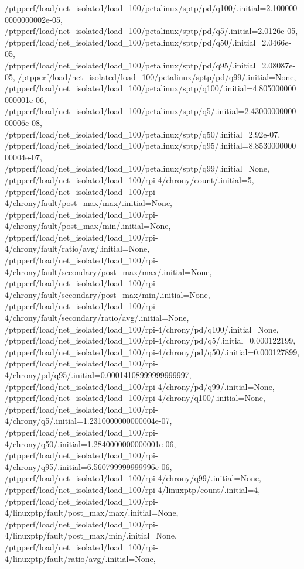 {    /ptpperf/load/net_isolated/load_100/petalinux/sptp/pd/q100/.initial=2.1000000000000002e-05,
    /ptpperf/load/net_isolated/load_100/petalinux/sptp/pd/q5/.initial=2.0126e-05,
    /ptpperf/load/net_isolated/load_100/petalinux/sptp/pd/q50/.initial=2.0466e-05,
    /ptpperf/load/net_isolated/load_100/petalinux/sptp/pd/q95/.initial=2.08087e-05,
    /ptpperf/load/net_isolated/load_100/petalinux/sptp/pd/q99/.initial=None,
    /ptpperf/load/net_isolated/load_100/petalinux/sptp/q100/.initial=4.805000000000001e-06,
    /ptpperf/load/net_isolated/load_100/petalinux/sptp/q5/.initial=2.4300000000000006e-08,
    /ptpperf/load/net_isolated/load_100/petalinux/sptp/q50/.initial=2.92e-07,
    /ptpperf/load/net_isolated/load_100/petalinux/sptp/q95/.initial=8.853000000000004e-07,
    /ptpperf/load/net_isolated/load_100/petalinux/sptp/q99/.initial=None,
    /ptpperf/load/net_isolated/load_100/rpi-4/chrony/count/.initial=5,
    /ptpperf/load/net_isolated/load_100/rpi-4/chrony/fault/post_max/max/.initial=None,
    /ptpperf/load/net_isolated/load_100/rpi-4/chrony/fault/post_max/min/.initial=None,
    /ptpperf/load/net_isolated/load_100/rpi-4/chrony/fault/ratio/avg/.initial=None,
    /ptpperf/load/net_isolated/load_100/rpi-4/chrony/fault/secondary/post_max/max/.initial=None,
    /ptpperf/load/net_isolated/load_100/rpi-4/chrony/fault/secondary/post_max/min/.initial=None,
    /ptpperf/load/net_isolated/load_100/rpi-4/chrony/fault/secondary/ratio/avg/.initial=None,
    /ptpperf/load/net_isolated/load_100/rpi-4/chrony/pd/q100/.initial=None,
    /ptpperf/load/net_isolated/load_100/rpi-4/chrony/pd/q5/.initial=0.000122199,
    /ptpperf/load/net_isolated/load_100/rpi-4/chrony/pd/q50/.initial=0.000127899,
    /ptpperf/load/net_isolated/load_100/rpi-4/chrony/pd/q95/.initial=0.00014108999999999997,
    /ptpperf/load/net_isolated/load_100/rpi-4/chrony/pd/q99/.initial=None,
    /ptpperf/load/net_isolated/load_100/rpi-4/chrony/q100/.initial=None,
    /ptpperf/load/net_isolated/load_100/rpi-4/chrony/q5/.initial=1.2310000000000004e-07,
    /ptpperf/load/net_isolated/load_100/rpi-4/chrony/q50/.initial=1.2840000000000001e-06,
    /ptpperf/load/net_isolated/load_100/rpi-4/chrony/q95/.initial=6.560799999999996e-06,
    /ptpperf/load/net_isolated/load_100/rpi-4/chrony/q99/.initial=None,
    /ptpperf/load/net_isolated/load_100/rpi-4/linuxptp/count/.initial=4,
    /ptpperf/load/net_isolated/load_100/rpi-4/linuxptp/fault/post_max/max/.initial=None,
    /ptpperf/load/net_isolated/load_100/rpi-4/linuxptp/fault/post_max/min/.initial=None,
    /ptpperf/load/net_isolated/load_100/rpi-4/linuxptp/fault/ratio/avg/.initial=None,
}
